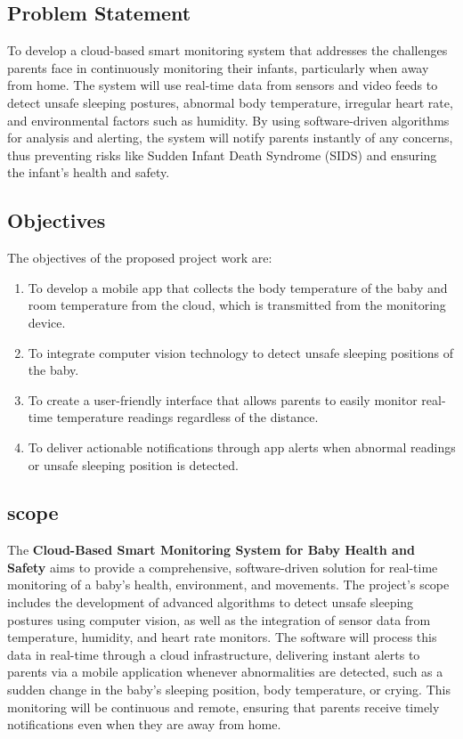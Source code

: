 \documentclass[conference]{IEEEtran}
\begin{document}
 \subsection{Problem Statement}
To develop a cloud-based smart monitoring system that addresses the challenges parents face in continuously monitoring their infants, particularly when away from home. The system will use real-time data from sensors and video feeds to detect unsafe sleeping postures, abnormal body temperature, irregular heart rate, and environmental factors such as humidity. By using software-driven algorithms for analysis and alerting, the system will notify parents instantly of any concerns, thus preventing risks like Sudden Infant Death Syndrome (SIDS) and ensuring the infant’s health and safety.

\subsection{Objectives}
The objectives of the proposed project work are:
\begin{enumerate}
    \item To develop a mobile app that collects the body temperature of the baby and room temperature from the cloud, which is transmitted from the monitoring device.
    \item To integrate computer vision technology to detect unsafe sleeping positions of the baby.
    \item To create a user-friendly interface that allows parents to easily monitor real-time temperature readings regardless of the distance.
    \item To deliver actionable notifications through app alerts when abnormal readings or unsafe sleeping position is detected.
\end{enumerate}

\subsection{scope}
The \textbf{Cloud-Based Smart Monitoring System for Baby Health and Safety} aims to provide a comprehensive, software-driven solution for real-time monitoring of a baby’s health, environment, and movements. The project’s scope includes the development of advanced algorithms to detect unsafe sleeping postures using computer vision, as well as the integration of sensor data from temperature, humidity, and heart rate monitors. The software will process this data in real-time through a cloud infrastructure, delivering instant alerts to parents via a mobile application whenever abnormalities are detected, such as a sudden change in the baby’s sleeping position, body temperature, or crying. This monitoring will be continuous and remote, ensuring that parents receive timely notifications even when they are away from home.
\end{document}
